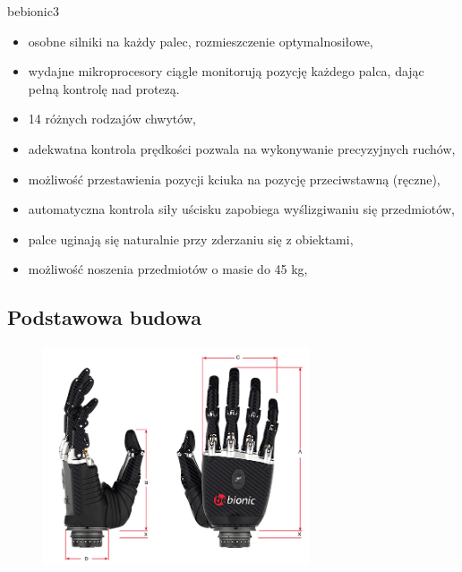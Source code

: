 \documentclass[8pt]{beamer}
\begin{document}
	\begin{frame}%
		bebionic3
		\begin{itemize}[<+->]
	\item osobne silniki na każdy palec, rozmieszczenie optymalnosiłowe,
	\item wydajne mikroprocesory ciągle monitorują pozycję każdego palca, dając pełną kontrolę nad protezą.
	\item 14 różnych rodzajów chwytów,
	\item adekwatna kontrola prędkości pozwala na wykonywanie precyzyjnych ruchów,
	\item możliwość przestawienia pozycji kciuka na pozycję przeciwstawną (ręczne),
	\item automatyczna kontrola siły uścisku zapobiega wyślizgiwaniu się przedmiotów,
	\item palce uginają się naturalnie przy zderzaniu się z obiektami,
	\item możliwość noszenia przedmiotów o masie do 45 kg,
		\end{itemize}

	\end{frame}

	\subsection{Podstawowa budowa}
	\begin{frame}
	\begin{center}
				\begin{figure}
					\includegraphics[width=0.7\textwidth]{graphics/bebionic_dimentions.jpg}
					\label{graph:grasp}	
					\caption{ \cite{bebionic}}
				\end{figure}
			\end{center}
	\end{frame}		
\end{document}

